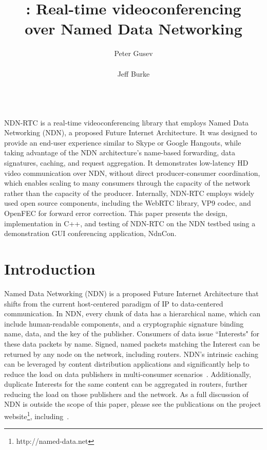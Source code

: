 \documentclass{icn/sig-alternate-2012} %
\title{\ndnrtcName{}: Real-time videoconferencing\\ over Named Data Networking}
\author{
\alignauthor Peter Gusev\\
       \affaddr{UCLA REMAP}\\
       \email{peter@remap.ucla.edu}
\alignauthor Jeff Burke\\
       \affaddr{UCLA REMAP}\\
       \email{jburke@remap.ucla.edu}
}
\newcommand{\ndnrtcName}{NDN-RTC} %
\newcommand{\ndnconName}{NdnCon}
\begin{document}
\maketitle

\abstract
\ndnrtcName{} is a real-time videoconferencing library that employs Named Data Networking (NDN), a proposed Future Internet Architecture. It was designed to provide an end-user experience similar to Skype or Google Hangouts, while taking advantage of the NDN architecture's name-based forwarding, data signatures, caching, and request aggregation. It demonstrates low-latency HD video communication over NDN, without direct producer-consumer coordination, which enables scaling to many consumers through the capacity of the network rather than the capacity of the producer. Internally, \ndnrtcName{} employs widely used open source components, including the WebRTC library, VP9 codec, and OpenFEC for forward error correction. This paper presents the design, implementation in C++, and testing of \ndnrtcName{} on the NDN testbed using a demonstration GUI conferencing application, \ndnconName{}.

\section{Introduction}
Named Data Networking (NDN) is a proposed Future Internet Architecture that shifts from the current host-centered paradigm of IP to data-centered communication. In NDN, every chunk of data has a hierarchical name, which can include human-readable components, and a cryptographic signature binding name, data, and the key of the publisher.  Consumers of data issue ``Interests" for these data packets by name. Signed, named packets matching the Interest can be returned by any node on the network, including routers. NDN's intrinsic caching can be leveraged by content distribution applications and significantly help to reduce the load on data publishers in multi-consumer scenarios~\cite{ndnvideo}. Additionally, duplicate Interests for the same content can be aggregated in routers, further reducing the load on those publishers and the network. As a full discussion of NDN is outside the scope of this paper, please see the publications on the project website\footnote{http://named-data.net}, including~\cite{ndntechreport, ndntechreport0, ndn-netw}.
\end{document}
